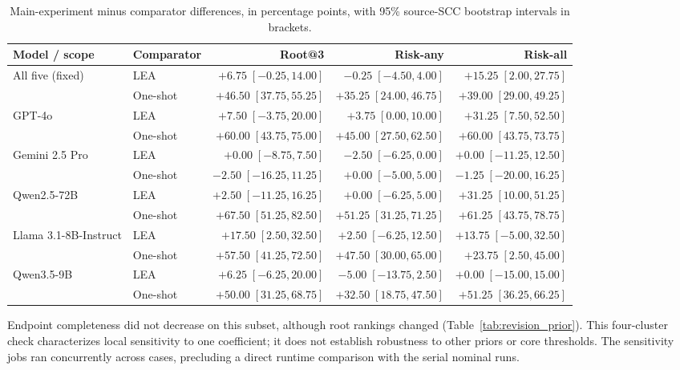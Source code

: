 \begin{revadded}
\begin{table}[!tp]
\centering
\small
\renewcommand{\arraystretch}{1.10}
\setlength{\tabcolsep}{3pt}
\begin{tabular}{L{0.21\textwidth}lrrr}
\toprule
\bfseries Model / scope & \bfseries Comparator & \bfseries Root@3 & \bfseries Risk-any & \bfseries Risk-all \\
\midrule
All five (fixed) & LEA & $+6.75\;[-0.25,14.00]$ & $-0.25\;[-4.50,4.00]$ & $+15.25\;[2.00,27.75]$ \\
 & One-shot & $+46.50\;[37.75,55.25]$ & $+35.25\;[24.00,46.75]$ & $+39.00\;[29.00,49.25]$ \\
\midrule
GPT-4o & LEA & $+7.50\;[-3.75,20.00]$ & $+3.75\;[0.00,10.00]$ & $+31.25\;[7.50,52.50]$ \\
 & One-shot & $+60.00\;[43.75,75.00]$ & $+45.00\;[27.50,62.50]$ & $+60.00\;[43.75,73.75]$ \\
\midrule
Gemini 2.5 Pro & LEA & $+0.00\;[-8.75,7.50]$ & $-2.50\;[-6.25,0.00]$ & $+0.00\;[-11.25,12.50]$ \\
 & One-shot & $-2.50\;[-16.25,11.25]$ & $+0.00\;[-5.00,5.00]$ & $-1.25\;[-20.00,16.25]$ \\
\midrule
Qwen2.5-72B & LEA & $+2.50\;[-11.25,16.25]$ & $+0.00\;[-6.25,5.00]$ & $+31.25\;[10.00,51.25]$ \\
 & One-shot & $+67.50\;[51.25,82.50]$ & $+51.25\;[31.25,71.25]$ & $+61.25\;[43.75,78.75]$ \\
\midrule
Llama 3.1-8B-Instruct & LEA & $+17.50\;[2.50,32.50]$ & $+2.50\;[-6.25,12.50]$ & $+13.75\;[-5.00,32.50]$ \\
 & One-shot & $+57.50\;[41.25,72.50]$ & $+47.50\;[30.00,65.00]$ & $+23.75\;[2.50,45.00]$ \\
\midrule
Qwen3.5-9B & LEA & $+6.25\;[-6.25,20.00]$ & $-5.00\;[-13.75,2.50]$ & $+0.00\;[-15.00,15.00]$ \\
 & One-shot & $+50.00\;[31.25,68.75]$ & $+32.50\;[18.75,47.50]$ & $+51.25\;[36.25,66.25]$ \\
\bottomrule
\end{tabular}
\caption{Main-experiment \samcgs{} minus comparator differences, in percentage points, with 95\% source-SCC bootstrap intervals in brackets.}
\label{tab:unified_paired_intervals}
\end{table}
\end{revadded}

Endpoint completeness did not decrease on this subset, although root rankings changed (Table~\ref{tab:revision_prior}). This four-cluster check characterizes local sensitivity to one coefficient; it does not establish robustness to other priors or core thresholds. The sensitivity jobs ran concurrently across cases, precluding a direct runtime comparison with the serial nominal runs.



